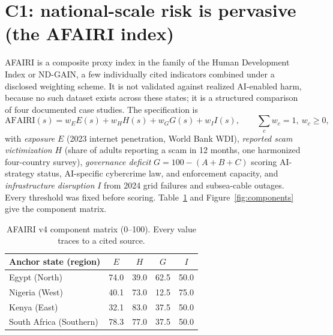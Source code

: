 \documentclass{article}
\begin{document}
\section{C1: national-scale risk is pervasive (the AFAIRI index)}
\label{sec:index}
AFAIRI is a composite proxy index in the family of the Human Development Index or ND-GAIN, a few individually
cited indicators combined under a disclosed weighting scheme. It is not validated against realized AI-enabled
harm, because no such dataset exists across these states; it is a structured comparison of four documented case
studies. The specification is
\begin{equation}
\mathrm{AFAIRI}(s) = w_E E(s) + w_H H(s) + w_G G(s) + w_I I(s), \qquad \textstyle\sum_c w_c = 1,\ w_c \ge 0,
\end{equation}
with \emph{exposure} $E$ (2023 internet penetration, World Bank WDI), \emph{reported scam victimization} $H$
(share of adults reporting a scam in 12 months, one harmonized four-country survey), \emph{governance deficit}
$G=100-(A+B+C)$ scoring AI-strategy status, AI-specific cybercrime law, and enforcement capacity, and
\emph{infrastructure disruption} $I$ from 2024 grid failures and subsea-cable outages. Every threshold was fixed
before scoring. Table~\ref{tab:components} and Figure~\ref{fig:components} give the component matrix.

\begin{table}[t]
\centering\small
\caption{AFAIRI v4 component matrix (0--100). Every value traces to a cited source.}
\label{tab:components}
\begin{tabular}{lcccc}
\toprule
Anchor state (region) & $E$ & $H$ & $G$ & $I$ \\
\midrule
Egypt (North) & 74.0 & 39.0 & 62.5 & 50.0 \\
Nigeria (West) & 40.1 & 73.0 & 12.5 & 75.0 \\
Kenya (East) & 32.1 & 83.0 & 37.5 & 50.0 \\
South Africa (Southern) & 78.3 & 77.0 & 37.5 & 50.0 \\
\bottomrule
\end{tabular}
\end{table}
\end{document}

